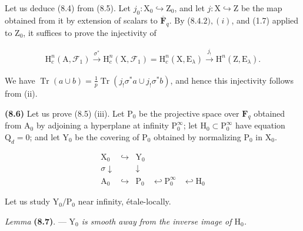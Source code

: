 \documentclass[10pt,leqno]{article}
\begin{document}
\clearpage

\label{physical-33}\par\smallskip

\noindent Let us deduce (8.4) from (8.5). Let \(j_{0} : \mathrm{X}_{0} \hookrightarrow  \mathrm{Z}_{0}\), and let \(j : \mathrm{X} \hookrightarrow  \mathrm{Z}\) be the map obtained from it by extension of scalars to \(\overline{\mathbf{F}}_{q}\). By (\(8.4.2), (i)\), and (1.7) applied to \(\mathrm{Z}_{0}\), it suffices to prove the injectivity of\par

\begin{equation*}\begin{gathered}\mathrm{H}_{c}^{n}(\mathrm{A},\mathcal{F} _{1}) \xrightarrow{\sigma ^{*}} \mathrm{H}_{c}^{n}(\mathrm{X},\mathcal{F} _{1}) = \mathrm{H}_{c}^{n}(\mathrm{X},\mathrm{E}_{\lambda }) \xrightarrow{j_{!}} \mathrm{H}^{n}(\mathrm{Z},\mathrm{E}_{\lambda }).\end{gathered}\end{equation*}

\noindent We have \(\operatorname{Tr}(a \cup  b) = \frac{1}{p} \operatorname{Tr}(j_{!}\sigma ^{*}a \cup  j_{!}\sigma ^{*}b)\), and hence this injectivity follows from (ii).\par

\noindent \textbf{(8.6)} Let us prove (8.5) (iii). Let \(\mathrm{P}_{0}\) be the projective space over \(\mathbf{F}_{q}\) obtained from \(\mathrm{A}_{0}\) by adjoining a hyperplane at infinity \(\mathrm{P}_{0}^{\infty }\); let \(\mathrm{H}_{0} \subset  \mathrm{P}_{0}^{\infty }\) have equation \(\mathrm{Q}_{d} = 0\); and let \(\mathrm{Y}_{0}\) be the covering of \(\mathrm{P}_{0}\) obtained by normalizing \(\mathrm{P}_{0}\) in \(\mathrm{X}_{0}\).\par

\[\begin{array}{ccccc}\mathrm X_0&\hookrightarrow&\mathrm Y_0&&\\ {\scriptstyle\sigma}\downarrow&&\downarrow&&\\ \mathrm A_0&\hookrightarrow&\mathrm P_0&\hookleftarrow\mathrm P_0^\infty&\hookleftarrow\mathrm H_0\end{array}\tag{8.6.1}\]

\noindent Let us study \(\mathrm{Y}_{0}/\mathrm{P}_{0}\) near infinity, étale-locally.\par

\noindent \emph{Lemma} \textbf{(8.7)}. — {\itshape \(\mathrm{Y}_{0}\) is smooth away from the inverse image of \(\mathrm{H}_{0}\).}\par
\end{document}
